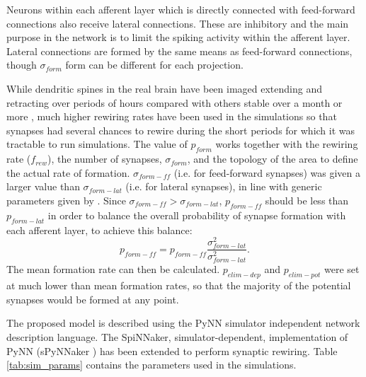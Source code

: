 \documentclass[letterpaper, 10 pt, conference]{ieeeconf}  %
\begin{document}
Neurons within each afferent layer which is directly connected with feed-forward connections also receive lateral connections. These are inhibitory and the main purpose in the network is to limit the spiking activity within the afferent layer. 
Lateral connections are formed by the same means as feed-forward connections, though $\sigma_{form}$ form can be different for each projection.

While dendritic spines in the real brain have been imaged extending and retracting over periods of hours compared with others stable over a month or more \cite{Grutzendler2002}, 
much higher rewiring rates have been used in the simulations so that synapses had several chances to rewire during the short periods for which it was tractable to run simulations.
The value of $p_{form}$ works together with the rewiring rate ($f_{rew}$), the number of synapses, $\sigma_{form}$, and the topology of the area to define the actual rate of formation.
$\sigma_{form-ff}$ (i.e. for feed-forward synapses) was given a larger value than $\sigma_{form-lat}$ (i.e. for lateral synapses), in line with generic parameters given by \cite{miikkulainen2006computational}.
Since $\sigma_{form-ff} > \sigma_{form-lat}$, $p_{form-ff}$ should be less than $p_{form-lat}$ in order to balance the overall probability of synapse formation with each afferent layer, to achieve this balance:
\begin{equation}
    p_{form-ff} = p_{form-ff} \frac{\sigma^2_{form-lat}}{\sigma^2_{form-lat}}.
\end{equation}
The mean formation rate can then be calculated. 
$p_{elim-dep}$ and $p_{elim-pot}$ were set at much lower than mean formation rates, so that the majority of the potential synapses would be formed at any point.

The proposed model is described using the PyNN \cite{davison2009pynn} simulator independent network description language. The SpiNNaker, simulator-dependent, implementation of PyNN (sPyNNaker \cite{rhodes2018spynnaker}) has been extended to perform synaptic rewiring. Table \ref{tab:sim_params} contains the parameters used in the simulations.
\end{document}
